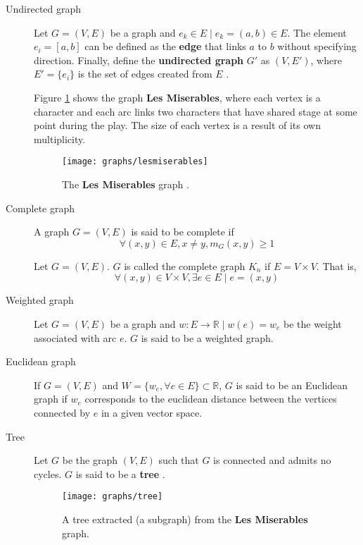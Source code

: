\begin{description}
	\item[Undirected graph] Let $G=(V, E)$ be a graph and $e_k \in E \mid e_k=(a, b) \in E$. The element $e_i=[a, b]$ can be defined as the \textbf{edge} that links $a$ to $b$ without specifying direction. Finally, define the \textbf{undirected graph} $G'$ as $(V, E')$, where $E'=\{e_i\}$ is the set of edges created from $E$ \cite{berge1973}.

	Figure \ref{fig:graph} shows the graph \textbf{Les Miserables}, where each vertex is a character and each arc links two characters that have shared stage at some point during the play. The size of each vertex is a result of its own multiplicity.

	\begin{figure}[H]
		\centering
		\texttt{[image: graphs/lesmiserables]}
		\caption{The \textbf{Les Miserables} graph \protect\footnotemark.}
		\label{fig:graph}
	\end{figure}
	

	\item[Complete graph] A graph $G=(V, E)$ is said to be complete if
	$$\forall (x, y)\in E, x\ne y, m_G(x, y) \ge 1$$

	\begin{remark}
		Let $G=(V, E)$. $G$ is called the complete graph $K_n$ if $E = V \times V$. That is,
		$$\forall (x, y)\in V \times V, \exists e \in E \mid e=(x, y)$$
	\end{remark}

	\item[Weighted graph] Let $G=(V, E)$ be a graph and $w\colon E \to \mathbb{R} \mid w(e) = w_e$ be the weight associated with arc $e$. $G$ is said to be a weighted graph.

	\item[Euclidean graph] If $G=(V, E)$ and $W=\{w_e, \forall e\in E\}\subset \mathbb{R}$, $G$ is said to be an Euclidean graph if $w_e$ corresponds to the euclidean distance between the vertices connected by $e$ in a given vector space.

	\item[Tree] Let $G$ be the graph $(V, E)$ such that $G$ is connected and admits no cycles. $G$ is  said to be a \textbf{tree} \cite{berge1973}. 

	\begin{figure}[H]
		\centering
		\texttt{[image: graphs/tree]}
		\captionsetup{justification=centering}
		\caption{A tree extracted (a subgraph) from the \textbf{Les Miserables} graph.}
		\label{tree}
	\end{figure}
\end{description}

